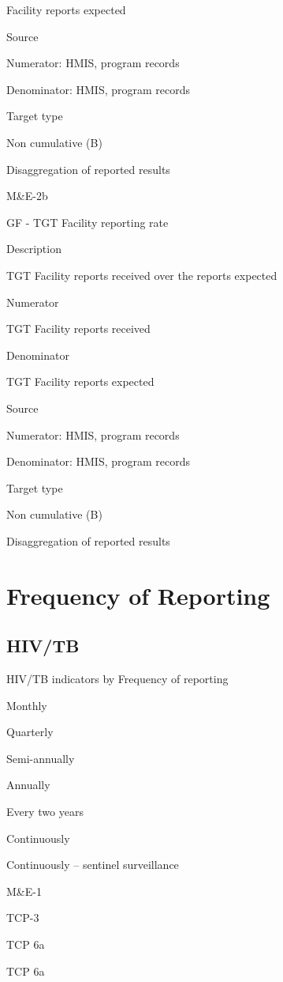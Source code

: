 \documentclass[]{book}
\begin{document}
Facility reports expected

Source

Numerator: HMIS, program records

Denominator: HMIS, program records

Target type

Non cumulative (B)

Disaggregation of reported results

M\&E-2b

GF - TGT Facility reporting rate

Description

TGT Facility reports received over the reports expected

Numerator

TGT Facility reports received

Denominator

TGT Facility reports expected

Source

Numerator: HMIS, program records

Denominator: HMIS, program records

Target type

Non cumulative (B)

Disaggregation of reported results

\hypertarget{frequency-of-reporting}{%
\section{Frequency of Reporting}\label{frequency-of-reporting}}

\hypertarget{hivtb}{%
\subsection{HIV/TB}\label{hivtb}}

\label{tab:unnamed-chunk-4}HIV/TB indicators by Frequency of reporting

Monthly

Quarterly

Semi-annually

Annually

Every two years

Continuously

Continuously -- sentinel surveillance

M\&E-1

TCP-3

TCP 6a

TCP 6a
\end{document}
